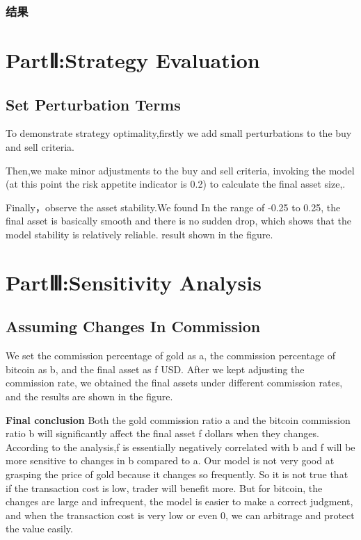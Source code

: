 \documentclass{mcmthesis}
\begin{document}
\subsubsection{结果}






\section{PartⅡ:Strategy Evaluation}
\subsection{Set Perturbation Terms }%
To demonstrate strategy optimality,firstly we add small perturbations to the buy and sell criteria.

Then,we make minor adjustments to the buy and sell criteria, invoking the model (at this point the risk appetite indicator is 0.2) to calculate the final asset size,.

Finally，observe the asset stability.We found In the range of -0.25 to 0.25, the final asset is basically smooth and there is no sudden drop, which shows that the model stability is relatively reliable.
result shown in the figure.

\section{PartⅢ:Sensitivity Analysis}
\subsection{Assuming Changes In Commission}
We set the commission percentage of gold as a, the commission percentage of bitcoin as b, and the final asset as f USD. 
After we kept adjusting the commission rate, we obtained the final assets under different commission rates, and the results are shown in the figure.%

\textbf{Final conclusion}
Both the gold commission ratio a and the bitcoin commission ratio b will significantly affect the final asset f dollars when they changes.
According to the analysis,f is essentially negatively correlated with b and f will be more sensitive to changes in b compared to a.
Our model is not very good at grasping the price of gold because it changes so frequently.
So it is not true that if the transaction cost is low, trader will benefit more.
But for bitcoin, the changes are large and infrequent, the model is easier to make a correct judgment, and when the transaction cost is very low or even 0, we can arbitrage and protect the value easily.
\end{document}
